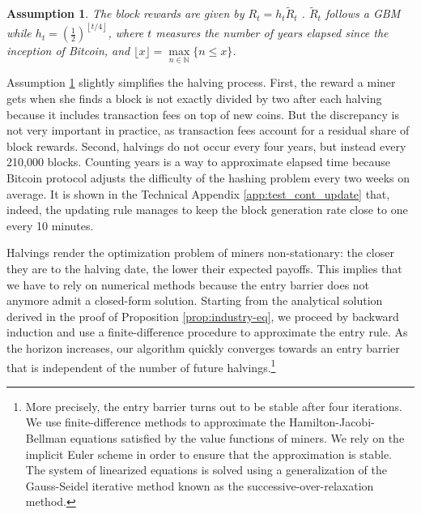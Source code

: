 \documentclass[12pt, a4paper]{article}
\makeatletter
\newtheorem{hyp}{Assumption}
\renewcommand{\section}{\@startsection{section}{2}{0mm}{-0.8\baselineskip}{.5\baselineskip}{\normalfont\large\bfseries}}
\makeatother
\begin{document}
\begin{hyp}
\label{hyp:halvings} The block rewards are given by $R_{t}=h_{t}\tilde{R}_{t}$%
. $\tilde{R}_{t}$ follows a GBM while $h_{t}=\left(\frac{1}{2}%
\right)^{\left\lfloor t/4\right\rfloor}$, where $t$ measures the number of
years elapsed since the inception of Bitcoin, and $\lfloor x
\rfloor = \mathop{\max}\limits_{n \in \mathds{N}} \{n \leq x\}$.
\end{hyp}

Assumption \ref{hyp:halvings} slightly simplifies the halving process.
First, the reward a miner gets when she finds a block is not exactly divided
by two after each halving because it includes transaction fees on top of new
coins. But the discrepancy is not very important in practice, as transaction fees
account for a residual share of block rewards.
Second, halvings do not occur every four years, but
instead every 210,000 blocks. Counting years is a way to approximate elapsed
time because Bitcoin protocol adjusts the difficulty of the hashing
problem every two weeks on average. It is shown in the Technical Appendix \ref{app:test_cont_update} that, indeed, the updating
rule manages to keep the block generation rate close to one every 10 minutes.

Halvings render the optimization problem of miners non-stationary: the closer they are to
the halving date, the lower their expected payoffs. This
implies that we have to rely on
numerical methods because the entry barrier does not anymore admit a closed-form solution.
Starting from the
analytical solution derived in the proof of Proposition \ref{prop:industry-eq}, we proceed by backward induction
and use a
finite-difference procedure to approximate the entry rule. As the horizon increases,
our algorithm quickly converges towards an entry barrier that is
independent of the number of future halvings.\footnote{%
More precisely, the entry barrier turns out to be stable after four
iterations. We use finite-difference methods to approximate the
Hamilton-Jacobi-Bellman equations satisfied by the value functions of
miners. We rely on the implicit Euler scheme in order to ensure that the
approximation is stable. The system of linearized equations is solved using
a generalization of the Gauss-Seidel iterative method known as the
successive-over-relaxation method.}


\section{Calibration}
\end{document}
